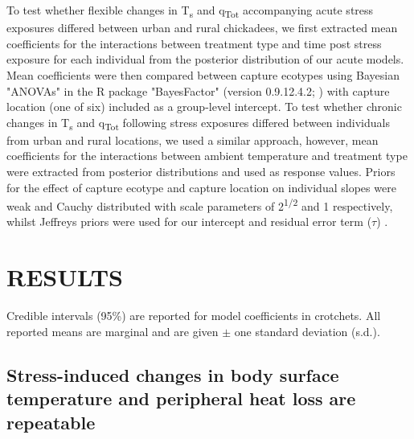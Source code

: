 \documentclass[12pt]{article}
\begin{document}
\noindent To test whether flexible changes in T\textsubscript{s} and q\textsubscript{Tot} accompanying acute stress exposures differed between urban and rural chickadees, we first extracted mean coefficients for the interactions between treatment type and time post stress exposure for each individual from the posterior distribution of our acute models. Mean coefficients were then compared between capture ecotypes using Bayesian "ANOVAs" in the R package "BayesFactor" (version 0.9.12.4.2; \citealt{morey_2019}) with capture location (one of six) included as a group-level intercept. To test whether chronic changes in T\textsubscript{s} and q\textsubscript{Tot} following stress exposures differed between individuals from urban and rural locations, we used a similar approach, however, mean coefficients for the interactions between ambient temperature and treatment type were extracted from posterior distributions and used as response values. Priors for the effect of capture ecotype and capture location on individual slopes were weak and Cauchy distributed with scale parameters of 2\textsuperscript{1/2} and 1 respectively, whilst Jeffreys priors were used for our intercept and residual error term ($\tau$) \citep{rouder_2012}.\vspace{0.5cm}

\section{RESULTS}
\vspace{0.5cm}

\noindent Credible intervals (95\%) are reported for model coefficients in crotchets. All reported means are marginal and are given $\pm$ one standard deviation (s.d.).
\vspace{0.5cm}

\subsection{Stress-induced changes in body surface temperature and peripheral heat loss are repeatable}
\vspace{0.5cm}
\end{document}
